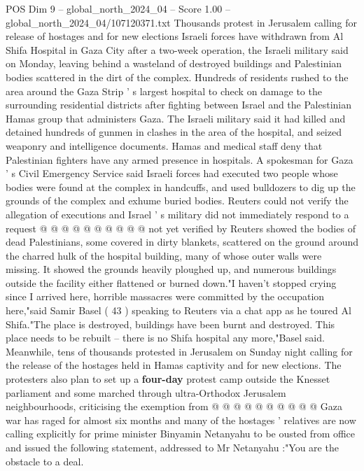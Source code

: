 \begin{textsample}{POS Dim 9 – global\_north\_2024\_04 – Score 1.00 – global\_north\_2024\_04/107120371.txt}  \label{ex:f9_pos_240}
Thousands protest in Jerusalem calling for release of hostages and for new elections Israeli forces have withdrawn from Al Shifa Hospital in Gaza City after a two-week operation, the Israeli military said on Monday, leaving behind a wasteland of destroyed buildings and Palestinian bodies scattered in the dirt of the complex.
Hundreds of residents rushed to the area around the Gaza Strip ' s largest hospital to check on damage to the surrounding residential districts after fighting between Israel and the Palestinian Hamas group that administers Gaza.
The Israeli military said it had killed and detained hundreds of gunmen in clashes in the area of the hospital, and seized weaponry and intelligence documents.
Hamas and medical staff deny that Palestinian fighters have any armed presence in hospitals.
A spokesman for Gaza ' s Civil Emergency Service said Israeli forces had executed two people whose bodies were found at the complex in handcuffs, and used bulldozers to dig up the grounds of the complex and exhume buried bodies.
Reuters could not verify the allegation of executions and Israel ' s military did not immediately respond to a request @ @ @ @ @ @ @ @ @ @ not yet verified by Reuters showed the bodies of dead Palestinians, some covered in dirty blankets, scattered on the ground around the charred hulk of the hospital building, many of whose outer walls were missing.
It showed the grounds heavily ploughed up, and numerous buildings outside the facility either flattened or burned down."I haven't stopped crying since I arrived here, horrible massacres were committed by the occupation here,"said Samir Basel ( 43 ) speaking to Reuters via a chat app as he toured Al Shifa."The place is destroyed, buildings have been burnt and destroyed.
This place needs to be rebuilt -- there is no Shifa hospital any more,"Basel said.
Meanwhile, tens of thousands protested in Jerusalem on Sunday night calling for the release of the hostages held in Hamas captivity and for new elections.
The protesters also plan to set up a \textbf{four-day} protest camp outside the Knesset parliament and some marched through ultra-Orthodox Jerusalem neighbourhoods, criticising the exemption from @ @ @ @ @ @ @ @ @ @ Gaza war has raged for almost six months and many of the hostages ' relatives are now calling explicitly for prime minister Binyamin Netanyahu to be ousted from office and issued the following statement, addressed to Mr Netanyahu :"You are the obstacle to a deal.

\end{textsample}
